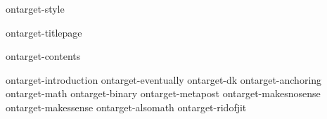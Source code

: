 
\environment ontarget-style

\dontcomplain

\startdocument

    \component ontarget-titlepage

    \startfrontmatter
        \component ontarget-contents
    \stopfrontmatter

    \startbodymatter
        \component ontarget-introduction
        \component ontarget-eventually
        \component ontarget-dk
        \component ontarget-anchoring
        \component ontarget-math
        \component ontarget-binary
        \component ontarget-metapost
        \component ontarget-makesnosense
        \component ontarget-makessense
        \component ontarget-alsomath
        \component ontarget-ridofjit
    \stopbodymatter

\stopdocument
